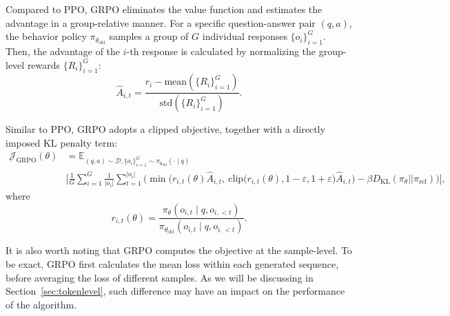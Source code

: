 Compared to PPO, GRPO eliminates the value function and estimates the advantage in a group-relative manner. For a specific question-answer pair $(q,a)$, the behavior policy $\pi_{\theta_\text{old}}$ samples a group of $G$ individual responses $\{ o_i\}_{i=1}^G$. Then, the advantage of the $i$-th response is calculated by normalizing the group-level rewards $\{ R_i \}_{i=1}^G$:
\begin{equation}
\hat{A}_{i,t} = \frac{r_i - \text{mean}(\{R_i\}_{i=1}^G)}{\text{std}(\{R_i\}_{i=1}^G)}.
\end{equation}

Similar to PPO, GRPO adopts a clipped objective, together with a directly imposed KL penalty term:
\begin{equation}
\begin{aligned}
\mathcal{J}_\text{GRPO}(\theta)& = \mathbb{E}_{(q,a)\sim \mathcal{D}, \{o_i\}_{i=1}^G\sim \pi_{\theta_\text{old}}(\cdot\mid q)} \\&
\Bigg[ \frac{1}{G}\sum_{i=1}^{G} \frac{1}{|o_i|}\sum_{t=1}^{|o_i|} \Bigg( 
\min \Big( r_{i,t}(\theta) \hat{A}_{i,t},  
\ \text{clip} \Big( r_{i,t}(\theta), 1 - \varepsilon, 1 + \varepsilon \Big) \hat{A}_{i,t} \Big)
- \beta D_{\text{KL}}(\pi_{\theta} || \pi_{\text{ref}}) 
\Bigg) \Bigg],
\label{eq:grpoloss}
\end{aligned}
\end{equation}
where
\begin{equation}
    r_{i,t}(\theta)=\frac{\pi_{\theta}(o_{i,t} \mid q, o_{i,<t})}{\pi_{\theta_{\text{old}}}(o_{i,t} \mid q,o_{i,<t})}.
\end{equation}

It is also worth noting that GRPO computes the objective at the sample-level. To be exact, GRPO first calculates the mean loss within each generated sequence, before averaging the loss of different samples. As we will be discussing in Section~\ref{sec:tokenlevel}, such difference may have an impact on the performance of the algorithm.


